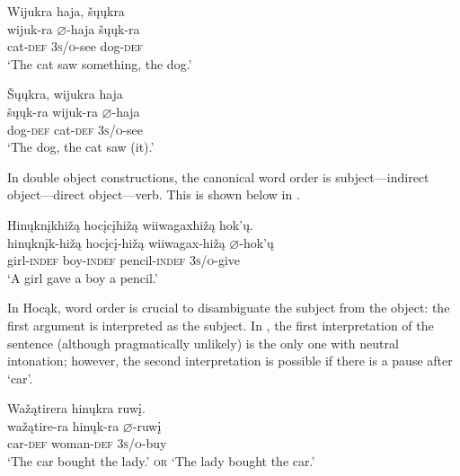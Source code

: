 \documentclass[output=paper]{LSP/langsci}
\begin{document}
\begin{exe}
\ex\label{ex:rosen:4}
\begin{xlist}

\ex \glll Wijukra  haja, šųųkra \\
 wijuk-ra {$\varnothing$}-haja  šųųk-ra\\
cat-\textsc{def}  \textsc{3s/o}-see dog-\textsc{def}\\
\glt `The cat saw something, the dog.' 

\ex \glll \v{S}ųųkra, wijukra haja  \\
 šųųk-ra wijuk-ra {$\varnothing$}-haja  \\
dog-\textsc{def} cat-\textsc{def}  \textsc{3s/o}-see \\
\glt `The dog, the cat saw (it).' 

\end{xlist}
\end{exe}

In double object constructions, the canonical word order is subject---indirect object---direct object---verb. This is shown below in .

\begin{exe}

\ex \label{ex:rosen:5}\glll Hinųknįkhižą hocįcįhižą wiiwagaxhižą hok'ų.\\
hinųknįk-hižą hocįcį-hižą wiiwagax-hižą {$\varnothing$}-hok'ų\\
girl-\textsc{indef} boy-\textsc{indef} pencil-\textsc{indef} \textsc{3s/o}-give\\
\glt `A girl gave a boy a pencil.'

\end{exe}

In Hocąk, word order is crucial to disambiguate the subject from the object: the first argument is interpreted as the subject. In , the first interpretation of the sentence (although pragmatically unlikely) is the only one with neutral intonation; however, the second interpretation is  possible if there is a pause after `car'.

\begin{exe}
\ex\label{ex:rosen:6}
 \glll Wažątirera hinųkra ruwį.\\
wažątire-ra hinųk-ra {$\varnothing$}-ruwį\\
car-\textsc{def} woman-\textsc{def} \textsc{3s/o}-buy\\
\glt `The car bought the lady.' \textsc{or} `The lady bought the car.'

\end{exe}
\end{document}
